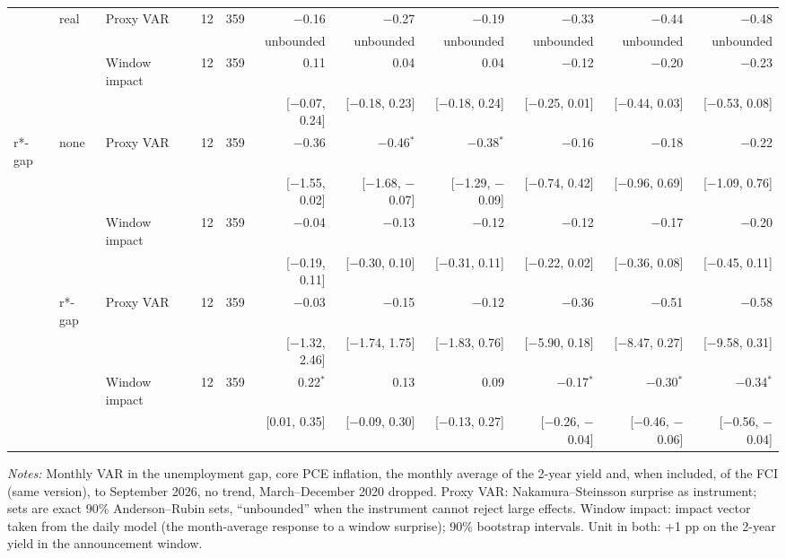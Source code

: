 \begin{table}[tp]
{\begin{tabular}{lllcrrrrrrr}
 & real & Proxy VAR & 12 & 359 & $-$0.16 & $-$0.27 & $-$0.19 & $-$0.33 & $-$0.44 & $-$0.48\\
 & & & & & {\tiny unbounded} & {\tiny unbounded} & {\tiny unbounded} & {\tiny unbounded} & {\tiny unbounded} & {\tiny unbounded}\\
 &  & Window impact & 12 & 359 & 0.11 & 0.04 & 0.04 & $-$0.12 & $-$0.20 & $-$0.23\\
 & & & & & {\tiny [$-$0.07, 0.24]} & {\tiny [$-$0.18, 0.23]} & {\tiny [$-$0.18, 0.24]} & {\tiny [$-$0.25, 0.01]} & {\tiny [$-$0.44, 0.03]} & {\tiny [$-$0.53, 0.08]}\\
\addlinespace
r*-gap & none & Proxy VAR & 12 & 359 & $-$0.36 & $-$0.46$^{*}$ & $-$0.38$^{*}$ & $-$0.16 & $-$0.18 & $-$0.22\\
 & & & & & {\tiny [$-$1.55, 0.02]} & {\tiny [$-$1.68, $-$0.07]} & {\tiny [$-$1.29, $-$0.09]} & {\tiny [$-$0.74, 0.42]} & {\tiny [$-$0.96, 0.69]} & {\tiny [$-$1.09, 0.76]}\\
 &  & Window impact & 12 & 359 & $-$0.04 & $-$0.13 & $-$0.12 & $-$0.12 & $-$0.17 & $-$0.20\\
 & & & & & {\tiny [$-$0.19, 0.11]} & {\tiny [$-$0.30, 0.10]} & {\tiny [$-$0.31, 0.11]} & {\tiny [$-$0.22, 0.02]} & {\tiny [$-$0.36, 0.08]} & {\tiny [$-$0.45, 0.11]}\\
 & r*-gap & Proxy VAR & 12 & 359 & $-$0.03 & $-$0.15 & $-$0.12 & $-$0.36 & $-$0.51 & $-$0.58\\
 & & & & & {\tiny [$-$1.32, 2.46]} & {\tiny [$-$1.74, 1.75]} & {\tiny [$-$1.83, 0.76]} & {\tiny [$-$5.90, 0.18]} & {\tiny [$-$8.47, 0.27]} & {\tiny [$-$9.58, 0.31]}\\
 &  & Window impact & 12 & 359 & 0.22$^{*}$ & 0.13 & 0.09 & $-$0.17$^{*}$ & $-$0.30$^{*}$ & $-$0.34$^{*}$\\
 & & & & & {\tiny [0.01, 0.35]} & {\tiny [$-$0.09, 0.30]} & {\tiny [$-$0.13, 0.27]} & {\tiny [$-$0.26, $-$0.04]} & {\tiny [$-$0.46, $-$0.06]} & {\tiny [$-$0.56, $-$0.04]}\\
\bottomrule\end{tabular}}
\begin{flushleft}\footnotesize\textit{Notes:} Monthly VAR in the unemployment gap, core PCE inflation, the monthly average of the 2-year yield and, when included, of the FCI (same version), to September 2026, no trend, March--December 2020 dropped. Proxy VAR: Nakamura--Steinsson surprise as instrument; sets are exact 90\% Anderson--Rubin sets, ``unbounded'' when the instrument cannot reject large effects. Window impact: impact vector taken from the daily model (the month-average response to a window surprise); 90\% bootstrap intervals. Unit in both: +1 pp on the 2-year yield in the announcement window.\end{flushleft}
\end{table}
